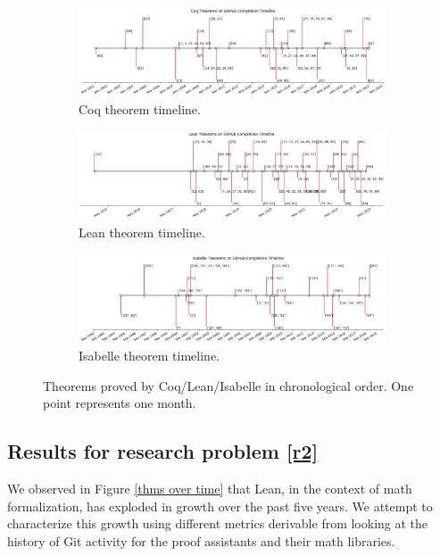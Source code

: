 \documentclass[sigconf,nonacm]{acmart}
\begin{document}
\begin{figure}[H]
  \begin{subfigure}{\columnwidth}
    \includegraphics[width=\linewidth]{coq_theorems_timeline.png}
    \caption{Coq theorem timeline.}
  \end{subfigure}
  \begin{subfigure}{\columnwidth}
    \includegraphics[width=\linewidth]{lean_theorems_timeline.png}
    \caption{Lean theorem timeline.}
  \end{subfigure}
  \begin{subfigure}{\columnwidth}
    \includegraphics[width=\linewidth]{isabelle_theorems_timeline.png}
    \caption{Isabelle theorem timeline.}
  \end{subfigure}
  \caption{Theorems proved by Coq/Lean/Isabelle in chronological order. One point represents one month.}
  \label{historical commits}
\end{figure}

\subsection{Results for research problem \ref{r2}}

We observed in Figure \ref{thms over time} that Lean, in the context of math formalization, has exploded in growth over the past five years. We attempt to characterize this growth using different metrics derivable from looking at the history of Git activity for the proof assistants and their math libraries.
\end{document}
